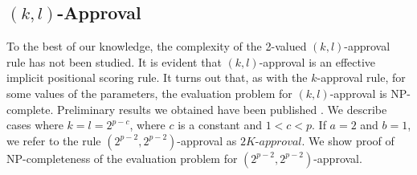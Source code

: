 \subsection{$(k,l)$-Approval}

To the best of our knowledge, the complexity of the 2-valued $(k,l)$-approval 
rule has not been studied. It is evident that $(k,l)$-approval is an effective
implicit positional scoring rule. It turns out that, as with the $k$-approval 
rule, for some values of the parameters, the evaluation problem for 
$(k,l)$-approval is NP-complete. Preliminary results we obtained 
have been published \cite{conf/adt13/LiuT}.
We describe cases where $k=l=2^{p-c}$,
where $c$ is a constant and $1<c<p$.
If $a=2$ and $b=1$, we refer to the rule 
$(2^{p-2},2^{p-2})$-approval as $2K$-$approval$.
We show proof of NP-completeness of the evaluation problem for
$(2^{p-2},2^{p-2})$-approval.

